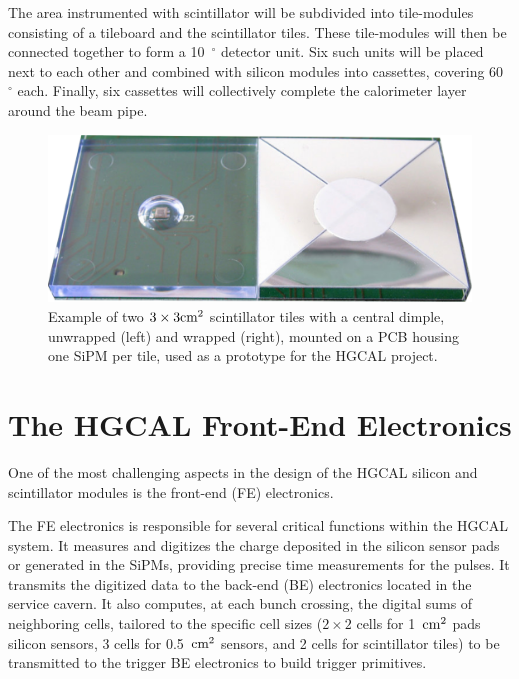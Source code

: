 The area instrumented with scintillator will be subdivided into tile-modules consisting of a tileboard and the scintillator tiles. These tile-modules will then be connected together to form a 10~$^{\circ}$ detector unit. Six such units will be placed next to each other and combined with silicon modules into cassettes, covering 60~$^{\circ}$ each. Finally, six cassettes will collectively complete the calorimeter layer around the beam pipe.

\begin{figure}
    \centering
    \includegraphics[width=0.5\linewidth]{Figures/HGCAL/ScintillatorTiles.pdf}
    \caption{Example of two $3\times3\textnormal{cm}^2$ scintillator tiles with a central dimple, unwrapped (left) and wrapped (right), mounted on a PCB housing one SiPM per tile, used as a prototype for the HGCAL project.}
    \label{fig:ScintillatorTiles}
\end{figure}

\section{The HGCAL Front-End Electronics}
\label{sec:The HGCAL Front-End Electronics}

One of the most challenging aspects in the design of the HGCAL silicon and scintillator modules is the front-end (FE) electronics. 

The FE electronics is responsible for several critical functions within the HGCAL system. It measures and digitizes the charge deposited in the silicon sensor pads or generated in the SiPMs, providing precise time measurements for the pulses. It transmits the digitized data to the back-end (BE) electronics located in the service cavern. It also computes, at each bunch crossing, the digital sums of neighboring cells, tailored to the specific cell sizes ($2\times2$ cells for 1~$\textnormal{cm}^2$ pads silicon sensors, 3 cells for 0.5~$\textnormal{cm}^2$ sensors, and 2 cells for scintillator tiles) to be transmitted to the trigger BE electronics to build trigger primitives.

